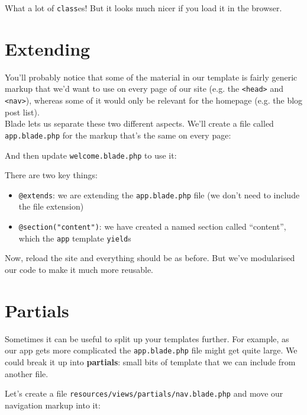 What a lot of \texttt{class}es! But it looks much nicer if you load it in the browser.



\section{Extending}

You'll probably notice that some of the material in our template is fairly generic markup that we'd want to use on every page of our site (e.g. the \texttt{<head>} and \texttt{<nav>}), whereas some of it would only be relevant for the homepage (e.g. the blog post list).
\\

Blade lets us separate these two different aspects. We'll create a file called \texttt{app.blade.php} for the markup that's the same on every page:


And then update \texttt{welcome.blade.php} to use it:


There are two key things:

\begin{itemize}
    \item \texttt{@extends}: we are extending the \texttt{app.blade.php} file (we don't need to include the file extension)
    \item \texttt{@section("content")}: we have created a named section called ``content'', which the \texttt{app} template \texttt{yield}s
\end{itemize}

Now, reload the site and everything should be as before. But we've modularised our code to make it much more reusable.


\section{Partials}

Sometimes it can be useful to split up your templates further. For example, as our app gets more complicated the \texttt{app.blade.php} file might get quite large. We could break it up into \textbf{partials}: small bits of template that we can include from another file.

\pagebreak

Let's create a file \texttt{resources/views/partials/nav.blade.php} and move our navigation markup into it:


